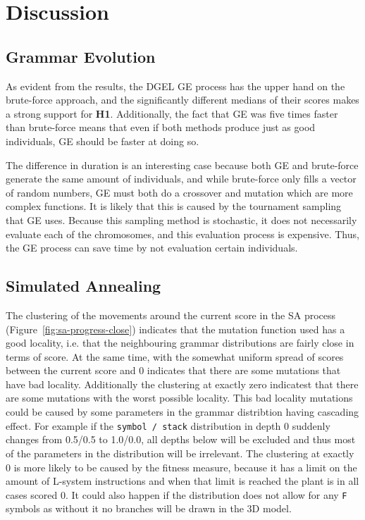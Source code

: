 \chapter{Discussion}
\section{Grammar Evolution}
As evident from the results, the DGEL GE process has the upper hand on the brute-force approach, and the significantly different medians of their scores makes a strong support for \textbf{H1}.
Additionally, the fact that GE was five times faster than brute-force means that even if both methods produce just as good individuals, GE should be faster at doing so.

The difference in duration is an interesting case because both GE and brute-force generate the same amount of individuals, and while brute-force only fills a vector of random numbers, GE must both do a crossover and mutation which are more complex functions.
It is likely that this is caused by the tournament sampling that GE uses.
Because this sampling method is stochastic, it does not necessarily evaluate each of the chromosomes, and this evaluation process is expensive.
Thus, the GE process can save time by not evaluation certain individuals.

\section{Simulated Annealing}
The clustering of the movements around the current score in the SA process (Figure~\ref{fig:sa-progress-close}) indicates that the mutation function used has a good locality, i.e. that the neighbouring grammar distributions are fairly close in terms of score.
At the same time, with the somewhat uniform spread of scores between the current score and 0 indicates that there are some mutations that have bad locality.
Additionally the clustering at exactly zero indicatest that there are some mutations with the worst possible locality.
This bad locality mutations could be caused by some parameters in the grammar distribtion having cascading effect.
For example if the \texttt{symbol / stack} distribution in depth 0 suddenly changes from 0.5/0.5 to 1.0/0.0, all depths below will be excluded and thus most of the parameters in the distribution will be irrelevant.
The clustering at exactly 0 is more likely to be caused by the fitness measure, because it has a limit on the amount of L-system instructions and when that limit is reached the plant is in all cases scored 0.
It could also happen if the distribution does not allow for any \texttt{F} symbols as without it no branches will be drawn in the 3D model.

